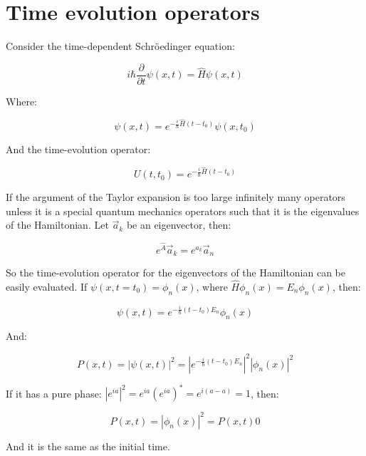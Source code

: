\section{Time evolution operators}
Consider the time-dependent Schr\"oedinger equation:

$$i\hbar\frac{\partial}{\partial t}\psi(x,t) = \hat{H}\psi(x,t)$$

Where:

$$\psi(x,t) = e^{-\frac{i}{\hbar}\hat{H}(t-t_0)}\psi(x,t_0)$$

And the time-evolution operator:

$$U(t,t_0) = e^{-\frac{i}{\hbar}\hat{H}(t-t_0)}$$

If the argument of the Taylor expansion is too large infinitely many operators unless it is a special quantum mechanics operators such that it is the eigenvalues of the Hamiltonian.
Let $\vec{a}_k$ be an eigenvector, then:

$$e^{\hat{A}}\vec{a}_k = e^{a_k}\vec{a}_n$$

So the time-evolution operator for the eigenvectors of the Hamiltonian can be easily evaluated.
If $\psi(x,t=t_0) = \phi_n(x)$, where $\hat{H}\phi_n(x) = E_n\phi_n(x)$, then:

$$\psi(x,t) = e^{-\frac{i}{\hbar}(t-t_0)E_n}\phi_n(x)$$

And:

$$P(x,t) = |\psi(x,t)|^2 = |e^{-\frac{i}{\hbar}(t-t_0)E_n}|^2|\phi_n(x)|^2$$

If it has a pure phase: $|e^{ia}|^2 = e^{ia}(e^{ia})^* = e^{i(a-a)} = 1$, then:

$$P(x,t) = |\phi_n(x)|^2 = P(x,t)0$$

And it is the same as the initial time.
